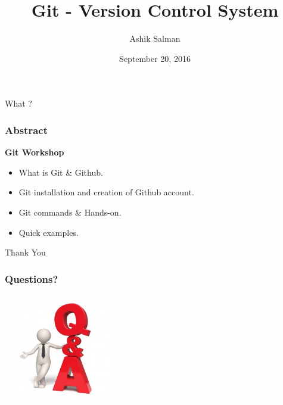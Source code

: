 \documentclass[10pt]{beamer}
\title{Git - Version Control System}
\author{Ashik Salman}
\institute[UMBC]{Beginner Workshop \\
  ..... \\
  Backend Developer \\
  Chillr, Backwater Technologies \\
  Kochi, Kerala \\

}
\date{September 20, 2016}
\begin{document}

\begin{frame}[plain]
  \titlepage
\end{frame}
	
\begin{frame}
  \begin{center}
    \Huge{What ?}
  \end{center}
\end{frame}

\begin{frame}
  \frametitle{Abstract}
  \textbf{Git Workshop}
  \medskip
  \begin{itemize}
    \item What is Git \& Github.
    \item Git installation and creation of Github account.
    \item Git commands \& Hands-on.
    \item Quick examples.
  \end{itemize}
\end{frame}

\begin{frame}
  \begin{center}
    \Huge{Thank You}
  \end{center}
\end{frame}

\begin{frame}
	\frametitle{Questions?}
	\begin{center}
	\includegraphics[width=0.35\textwidth]{q2.jpg}
	\end{center}
\end{frame}

\end{document}
